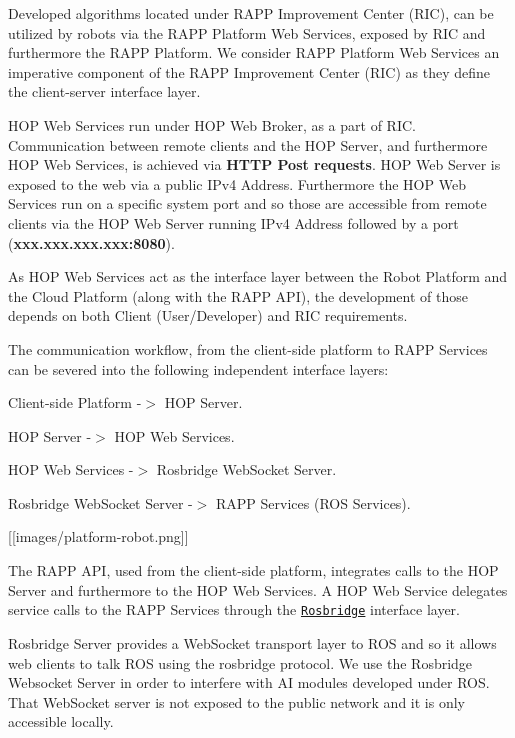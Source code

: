 Developed algorithms located under R\-A\-P\-P Improvement Center (R\-I\-C), can be utilized by robots via the R\-A\-P\-P Platform Web Services, exposed by R\-I\-C and furthermore the R\-A\-P\-P Platform. We consider R\-A\-P\-P Platform Web Services an imperative component of the R\-A\-P\-P Improvement Center (R\-I\-C) as they define the client-\/server interface layer.

H\-O\-P Web Services run under H\-O\-P Web Broker, as a part of R\-I\-C. Communication between remote clients and the H\-O\-P Server, and furthermore H\-O\-P Web Services, is achieved via {\bfseries H\-T\-T\-P Post requests}. H\-O\-P Web Server is exposed to the web via a public I\-Pv4 Address. Furthermore the H\-O\-P Web Services run on a specific system port and so those are accessible from remote clients via the H\-O\-P Web Server running I\-Pv4 Address followed by a port ({\bfseries xxx.\-xxx.\-xxx.\-xxx\-:8080}).

As H\-O\-P Web Services act as the interface layer between the Robot Platform and the Cloud Platform (along with the R\-A\-P\-P A\-P\-I), the development of those depends on both Client (User/\-Developer) and R\-I\-C requirements.

The communication workflow, from the client-\/side platform to R\-A\-P\-P Services can be severed into the following independent interface layers\-:


\begin{DoxyItemize}
\item Client-\/side Platform -\/$>$ H\-O\-P Server.
\item H\-O\-P Server -\/$>$ H\-O\-P Web Services.
\item H\-O\-P Web Services -\/$>$ Rosbridge Web\-Socket Server.
\item Rosbridge Web\-Socket Server -\/$>$ R\-A\-P\-P Services (R\-O\-S Services).
\end{DoxyItemize}

\mbox{[}\mbox{[}images/platform-\/robot.\-png\mbox{]}\mbox{]}

The R\-A\-P\-P A\-P\-I, used from the client-\/side platform, integrates calls to the H\-O\-P Server and furthermore to the H\-O\-P Web Services. A H\-O\-P Web Service delegates service calls to the R\-A\-P\-P Services through the \href{https://github.com/RobotWebTools/rosbridge_suite}{\tt Rosbridge} interface layer.

Rosbridge Server provides a Web\-Socket transport layer to R\-O\-S and so it allows web clients to talk R\-O\-S using the rosbridge protocol. We use the Rosbridge Websocket Server in order to interfere with A\-I modules developed under R\-O\-S. That Web\-Socket server is not exposed to the public network and it is only accessible locally.

